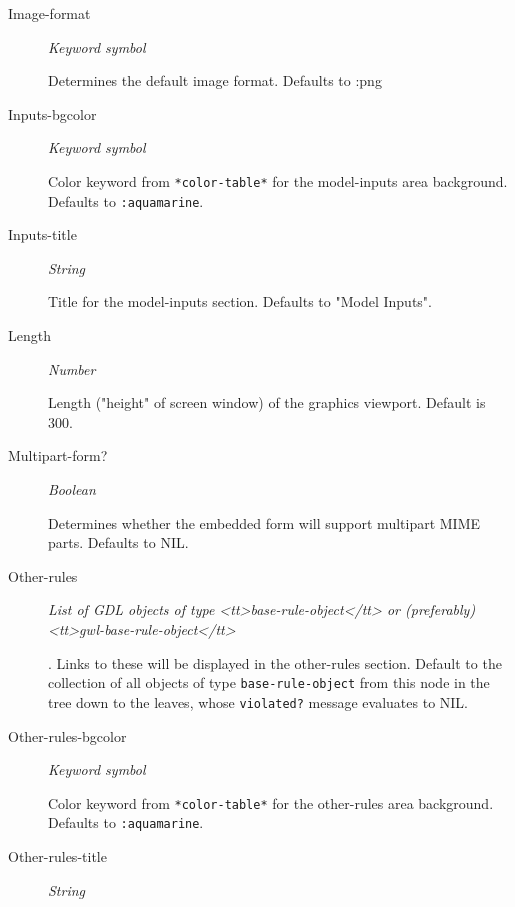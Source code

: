 \documentclass [11pt]{book}
\begin{document}
\begin{itemize}
\begin{description}
\item [Image-format]
\emph{Keyword symbol}

 Determines the default image format. Defaults to :png




\item [Inputs-bgcolor]
\emph{Keyword symbol}

 Color keyword from \texttt{*color-table*} for the model-inputs area background. Defaults to \texttt{:aquamarine}.




\item [Inputs-title]
\emph{String}

 Title for the model-inputs section. Defaults to "Model Inputs".




\item [Length]
\emph{Number}

 Length ("height" of screen window) of the graphics viewport. Default is 300.




\item [Multipart-form?]
\emph{Boolean}

 Determines whether the embedded form will support multipart MIME parts. Defaults to NIL.




\item [Other-rules]
\emph{List of GDL objects of type <tt>base-rule-object</tt> or (preferably) <tt>gwl-base-rule-object</tt>}

.
Links to these will be displayed in the other-rules section. Default to the collection of all objects of type
\texttt{base-rule-object} from this node in the tree down to the leaves, whose \texttt{violated?} message
evaluates to NIL.




\item [Other-rules-bgcolor]
\emph{Keyword symbol}

 Color keyword from \texttt{*color-table*} for the other-rules area  background. Defaults to \texttt{:aquamarine}.




\item [Other-rules-title]
\emph{String}


\end{description}
\end{itemize}
\end{document}
